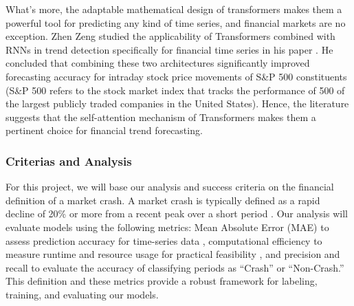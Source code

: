\documentclass[12pt, letterpaper]{article}
\begin{document}
What's more, the adaptable mathematical design of transformers makes them a powerful tool for predicting any kind of time series, and financial markets are no exception. Zhen Zeng studied the applicability of Transformers combined with RNNs in trend detection specifically for financial time series in his paper \cite{zeng2023financial}. He concluded that combining these two architectures significantly improved forecasting accuracy for intraday stock price movements of S\&P 500 constituents (S\&P 500 refers to the stock market index that tracks the performance of 500 of the largest publicly traded companies in the United States). Hence, the literature suggests that the self-attention mechanism of Transformers makes them a pertinent choice for financial trend forecasting.

\subsubsection*{Criterias and Analysis}
For this project, we will base our analysis and success criteria on the financial definition of a market crash. A market crash is typically defined as a rapid decline of 20\% or more from a recent peak over a short period \cite{Fonville, Investo}. Our analysis will evaluate models using the following metrics: Mean Absolute Error (MAE) to assess prediction accuracy for time-series data \cite{hyndman2018}, computational efficiency to measure runtime and resource usage for practical feasibility \cite{lim2021temporal}, and precision and recall to evaluate the accuracy of classifying periods as “Crash” or “Non-Crash.” This definition and these metrics provide a robust framework for labeling, training, and evaluating our models.


\pagebreak
\printbibliography

\end{document}
